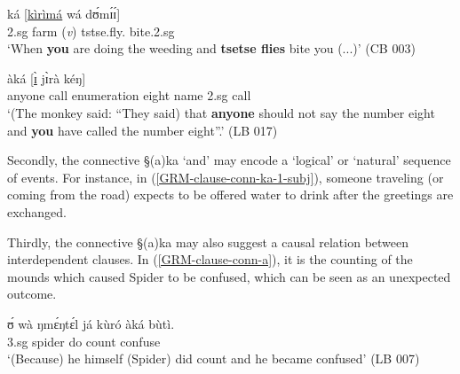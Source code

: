 \begin{exe}
\ex\label{GRM-clause-conn-(a)ka-2-subj} 
\begin{xlist}
\ex\label{GRM-clause-conn-ka-2-subj} 
\gll  [dɪ̀   	 \underline{ɪ̀}     	wá        	pàrà] 	ká   
[\underline{kìrìmá}     wá  	dʊ́mɪ́ɪ́]\\
{\conn} 	 {\sc 2.sg}  	{\ingr}     {farm ({\it v})}   	{\conn} 
tstse.fly.{\pl}        {\ingr}  bite.{\sc 2.sg} \\
\glt  `When  \textbf{you} are doing the weeding and  \textbf{tsetse flies} bite
you (...)' (CB 003) 

\ex\label{GRM-clause-conn-aka-2-subj} 
 àká  [\underline{ɪ̀}    jɪ̀rà 	kéŋ]  \\
{\comp} 	anyone 	           {\neg} 	{\itr} {\ingr}  
   call         enumeration          
eight    name    	{\conn} 	{\sc 2.sg} 	call   	{\adv} \\
\glt  `(The monkey said:  ``They said) that \textbf{anyone} should not say the
number eight and \textbf{you} have called the number eight''.' (LB
017) 
\end{xlist}
\end{exe}


Secondly, the connective {\S (a)ka} `and'  may encode a `logical' or `natural'
sequence of events.   For instance, in (\ref{GRM-clause-conn-ka-1-subj}), 
someone traveling (or coming from the road) expects to be offered
water to drink
after the greetings are exchanged. 



Thirdly, the  connective {\S (a)ka}
may also suggest a causal relation between interdependent clauses. In 
(\ref{GRM-clause-conn-a}), it is the counting of the mounds which caused Spider
to be confused, which can be seen as an unexpected outcome.  




\begin{exe}
\ex\label{GRM-clause-conn-a} 
\gll   ʊ́  wà  ŋmɛ́ŋtɛ́l 	já  	      kùró 
àká  	bùtì. \\
{\sc 3.sg} {\foc}   spider do count 	  
{\conn}  confuse\\
\glt  `(Because) he himself (Spider) did count and he became confused'
(LB  007) 
 \end{exe}



